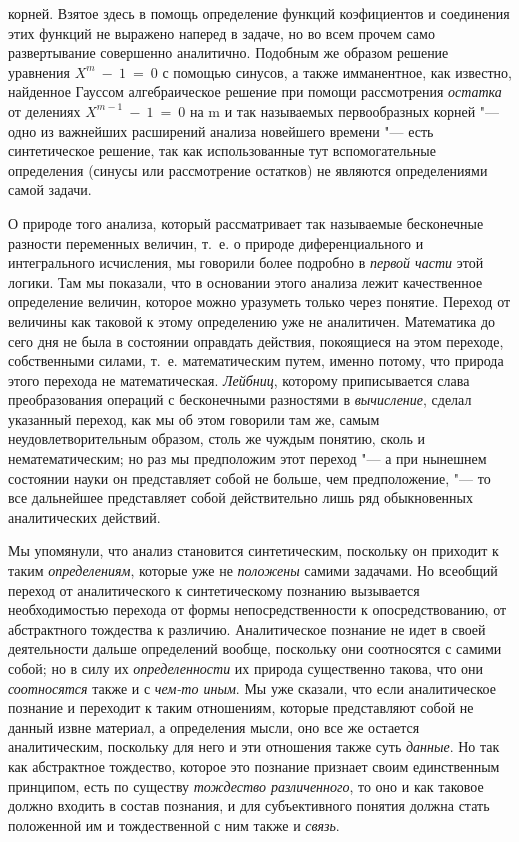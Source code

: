 {{корней. Взятое здесь в помощь определение функций коэфициентов и соединения
этих функций не выражено наперед в задаче, но во всем прочем само
развертывание совершенно аналитично. Подобным же образом
решение уравнения $X^m~-~1~=~0$
с помощью синусов, а также имманентное, как известно,
найденное
Гауссом
алгебраическое решение при помощи рассмотрения
{\em остатка} от делениях $X^{m-1}~-~1~=~0$ на m и так называемых
первообразных корней
"--- одно из важнейших расширений анализа новейшего времени
"--- есть синтетическое решение, так как использованные тут
вспомогательные определения (синусы или рассмотрение остатков) не являются
определениями самой задачи.

О природе того анализа, который рассматривает так называемые
бесконечные разности переменных величин, т.~е. о природе диференциального и
интегрального исчисления, мы говорили более подробно в
{\em первой части} этой
логики. Там мы показали, что в основании этого анализа лежит качественное
определение величин, которое можно уразуметь только через понятие. Переход
от величины как таковой к этому определению уже не аналитичен. Математика
до сего дня не была в состоянии оправдать действия, покоящиеся на этом
переходе, собственными силами, т.~е. математическим путем, именно потому,
что природа этого перехода не математическая.
{\em Лейбниц}, которому
приписывается слава преобразования операций с бесконечными разностями в
{\em вычисление}, сделал
указанный переход, как мы об этом говорили там же, самым
неудовлетворительным образом, столь же чуждым понятию, сколь и
нематематическим; но раз мы предположим этот переход "--- а при
нынешнем состоянии науки он представляет собой не больше, чем
предположение, "--- то все дальнейшее представляет собой
действительно лишь ряд обыкновенных аналитических действий.

Мы упомянули, что анализ становится синтетическим, поскольку
он приходит к таким {\em определениям},
которые уже не
{\em положены} самими
задачами. Но всеобщий переход от аналитического к синтетическому познанию
вызывается необходимостью перехода от формы непосредственности к
опосредствованию, от абстрактного тождества к различию. Аналитическое
познание не идет в своей деятельности дальше определений вообще, поскольку
они соотносятся с самими собой; но в силу их
{\em определенности} их
природа существенно такова, что они
{\em соотносятся} также и
с {\em чем-то иным}.
Мы уже сказали, что если аналитическое познание и переходит к
таким отношениям, которые представляют собой не данный извне материал, а
определения мысли, оно все же остается аналитическим, поскольку для него и
эти отношения также суть {\em данные}.
Но так как абстрактное тождество, которое это познание
признает своим единственным принципом, есть по существу
{\em тождество различенного},
то оно и как таковое должно входить в состав
познания, и для субъективного понятия должна стать положенной им и
тождественной с ним также и
{\em связь}.

}}
